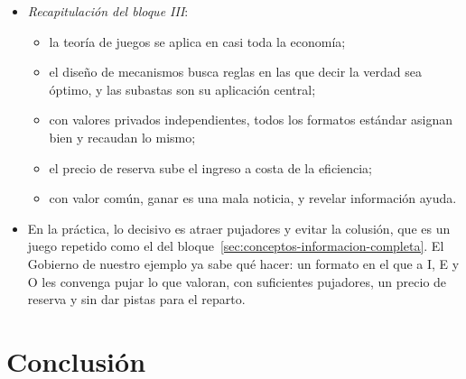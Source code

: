 \documentclass[11pt]{article}
\begin{document}
\begin{itemize}
\item \emph{Recapitulación del bloque III}:
  \begin{itemize}
  \item la teoría de juegos se aplica en casi toda la economía;
  \item el diseño de mecanismos busca reglas en las que decir la verdad sea óptimo, y las subastas son su aplicación central;
  \item con valores privados independientes, todos los formatos estándar asignan bien y recaudan lo mismo;
  \item el precio de reserva sube el ingreso a costa de la eficiencia;
  \item con valor común, ganar es una mala noticia, y revelar información ayuda.
  \end{itemize}
\item En la práctica, lo decisivo es atraer pujadores y evitar la colusión, que es un juego repetido como el del bloque~\ref{sec:conceptos-informacion-completa}. El Gobierno de nuestro ejemplo ya sabe qué hacer: un formato en el que a I, E y O les convenga pujar lo que valoran, con suficientes pujadores, un precio de reserva y sin dar pistas para el reparto.
\end{itemize}


\section*{Conclusión}
\end{document}
